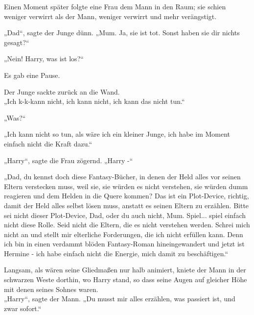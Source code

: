 {Einen Moment später folgte eine Frau dem Mann in den Raum; sie schien weniger verwirrt als der Mann, weniger verwirrt und mehr verängstigt.

„Dad“, sagte der Junge dünn. „Mum. Ja, sie ist tot. Sonst haben sie dir nichts gesagt?“

„Nein! Harry, was ist los?“

Es gab eine Pause.

Der Junge sackte zurück an die Wand.\\ „Ich k-k-kann nicht, ich kann nicht, ich kann das nicht tun.“

„Was?“

„Ich kann nicht so tun, als wäre ich ein kleiner Junge, ich habe im Moment einfach nicht die Kraft dazu.“

„Harry“, sagte die Frau zögernd. „Harry -“

„Dad, du kennst doch diese Fantasy-Bücher, in denen der Held alles vor seinen Eltern verstecken muss, weil sie, sie würden es nicht verstehen, sie würden dumm reagieren und dem Helden in die Quere kommen? Das ist ein Plot-Device, richtig, damit der Held alles selbst lösen muss, anstatt es seinen Eltern zu erzählen. Bitte sei nicht dieser Plot-Device, Dad, oder du auch nicht, Mum. Spiel... spiel einfach nicht diese Rolle. Seid nicht die Eltern, die es nicht verstehen werden. Schrei mich nicht an und stellt mir elterliche Forderungen, die ich nicht erfüllen kann. Denn ich bin in einen verdammt blöden Fantasy-Roman hineingewandert und jetzt ist Hermine - ich habe einfach nicht die Energie, mich damit zu beschäftigen.“

Langsam, als wären seine Gliedmaßen nur halb animiert, kniete der Mann in der schwarzen Weste dorthin, wo Harry stand, so dass seine Augen auf gleicher Höhe mit denen seines Sohnes waren.\\ „Harry“, sagte der Mann. „Du musst mir alles erzählen, was passiert ist, und zwar sofort.“

}

